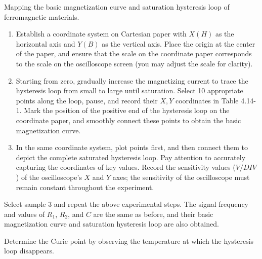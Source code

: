\documentclass[UTF8]{article}
\begin{document}
	Mapping the basic magnetization curve and saturation hysteresis loop of ferromagnetic materials.
	\begin{enumerate}
	    \item Establish a coordinate system on Cartesian paper with \(X(H)\) as the horizontal axis and \(Y(B)\) as the vertical axis. Place the origin at the center of the paper, and ensure that the scale on the coordinate paper corresponds to the scale on the oscilloscope screen (you may adjust the scale for clarity).
	    
	    \item Starting from zero, gradually increase the magnetizing current to trace the hysteresis loop from small to large until saturation. Select 10 appropriate points along the loop, pause, and record their \(X, Y\) coordinates in Table 4.14-1. Mark the position of the positive end of the hysteresis loop on the coordinate paper, and smoothly connect these points to obtain the basic magnetization curve.
	    
	    \item In the same coordinate system, plot points first, and then connect them to depict the complete saturated hysteresis loop. Pay attention to accurately capturing the coordinates of key values. Record the sensitivity values (\(V/DIV\)) of the oscilloscope's \(X\) and \(Y\) axes; the sensitivity of the oscilloscope must remain constant throughout the experiment.
	\end{enumerate}
	
	Select sample 3 and repeat the above experimental steps. The signal frequency and values of $R_1$, $R_2$, and $C$ are the same as before, and their basic magnetization curve and saturation hysteresis loop are also obtained.
	
	Determine the Curie point by observing the temperature at which the hysteresis loop
	disappears.
	
\end{document}
